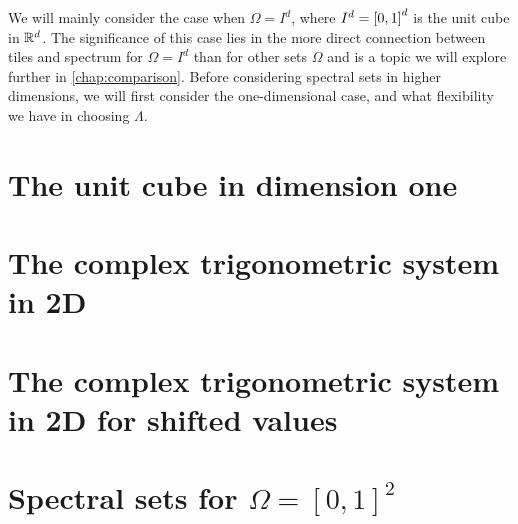 \documentclass[../thesis.tex]{subfiles}
\begin{document}
We will mainly consider the case when $\Omega=I^d$, where $I^d=\left[0,1\right]^d$ is the unit cube in $\mathbb{R}^d$. The significance of this case lies in the more direct connection between tiles and spectrum for $\Omega=I^d$ than for other sets $\Omega$ and is a topic we will explore further in \cref{chap:comparison}.
Before considering spectral sets in higher dimensions, we will first consider the one-dimensional case, and what flexibility we have in choosing $\Lambda$.

\section{The unit cube in dimension one}\label{sec:complx_trig_1d}
    


\section{The complex trigonometric system in 2D}\label{sec:complx_trig_2d}
    

\section{The complex trigonometric system in 2D for shifted values}
    



\section{Spectral sets for $\Omega = [0,1]^2$}
\end{document}
